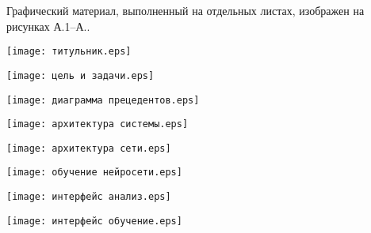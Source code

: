 
Графический материал, выполненный на отдельных листах,
изображен на рисунках А.1--А..
\setcounter{числоПлакатов}{0}

\renewcommand{\thefigure}{А.\arabic{figure}} %

\begin{landscape}

\begin{плакат}
    \texttt{[image: титульник.eps]}
    \label{pl1:image}      
\end{плакат}

\begin{плакат}
	\texttt{[image: цель и задачи.eps]}
	\label{pl2:image}      
\end{плакат}

\begin{плакат}
	\texttt{[image: диаграмма прецедентов.eps]}
	\label{pl3:image}      
\end{плакат}

\begin{плакат}
	\texttt{[image: архитектура системы.eps]}
	\label{pl4:image}      
\end{плакат}

\begin{плакат}
	\texttt{[image: архитектура сети.eps]}
	\label{pl5:image}      
\end{плакат}

\begin{плакат}
	\texttt{[image: обучение нейросети.eps]}
	\label{pl6:image}      
\end{плакат}

\begin{плакат}
	\texttt{[image: интерфейс анализ.eps]}
	\label{pl7:image}      
\end{плакат}

\begin{плакат}
	\texttt{[image: интерфейс обучение.eps]}
	\label{pl8:image}      
\end{плакат}


\end{landscape}
